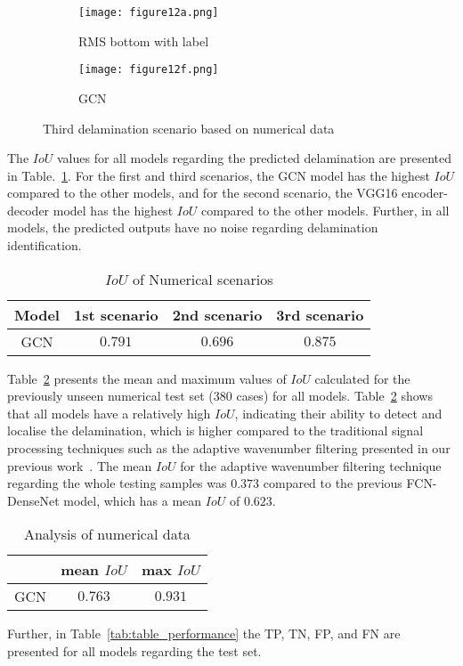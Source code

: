 \documentclass[runningheads]{llncs}
\begin{document}
\begin{figure}[!ht]
	\centering
	\begin{subfigure}[b]{0.47\textwidth}
		\centering
		\texttt{[image: figure12a.png]}
		\caption{RMS bottom with label}
		\label{fig:RMS_flat_shell_Vz_475}
	\end{subfigure}
	\begin{subfigure}[b]{0.47\textwidth}
		\centering
		\texttt{[image: figure12f.png]}
		\caption{GCN}
		\label{fig:gcn_pred_475}
	\end{subfigure}	
	\caption{Third delamination scenario based on numerical data}
	\label{fig:475_softmax}
\end{figure}

The \(IoU\) values for all models regarding the predicted delamination are presented in Table.~\ref{tab:table_numerical_scenarios}.
For the first and third scenarios, the GCN model has the highest \(IoU\) compared to the other models, and for the second scenario, the VGG16 encoder-decoder model has the highest \(IoU\) compared to the other models.
Further, in all models, the predicted outputs have no noise regarding delamination identification.
\begin{table}[]
	\centering
	\caption{\(IoU\) of Numerical scenarios}
	\label{tab:table_numerical_scenarios}
	{
		\begin{tabular}{cccc}\hline
			Model & 1st scenario & 2nd scenario & 3rd scenario \\ \hline 
			GCN & \(0.791\) & \(0.696\) & \(0.875\) \\ \hline
		\end{tabular}
	}
\end{table}
Table~\ref{tab:table_iou} presents the mean and maximum values of \(IoU\) calculated for the previously unseen numerical test set (380 cases) for all models.
Table~\ref{tab:table_iou} shows that all models have a relatively high \(IoU\), indicating their ability to detect and localise the delamination, which is higher compared to the traditional signal processing techniques such as the adaptive wavenumber filtering presented in our previous work~\cite{Ijjeh2021}. 
The mean \(IoU\) for the adaptive wavenumber filtering technique regarding the whole testing samples was \(0.373\) compared to the previous FCN-DenseNet model, which has a mean \(IoU\) of \(0.623\).
\begin{table}[]
	\centering
	\caption{Analysis of numerical data}
	\label{tab:table_iou}
	\begin{tabular}{ccc}\hline
		 & mean \(IoU\) & max \(IoU\) \\ \hline
		GCN & \(0.763\) & \(0.931\) \\ \hline
	\end{tabular}
\end{table}
Further, in Table~\ref{tab:table_performance} the TP, TN, FP, and FN are presented for all models regarding the test set. 
\end{document}
